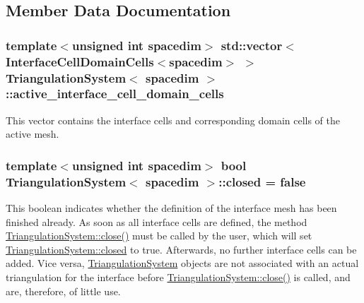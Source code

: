 \subsection{Member Data Documentation}
\subsubsection[{\texorpdfstring{active\+\_\+interface\+\_\+cell\+\_\+domain\+\_\+cells}{active_interface_cell_domain_cells}}]{\setlength{\rightskip}{0pt plus 5cm}template$<$unsigned int spacedim$>$ std\+::vector$<${\bf Interface\+Cell\+Domain\+Cells}$<$spacedim$>$ $>$ {\bf Triangulation\+System}$<$ spacedim $>$\+::active\+\_\+interface\+\_\+cell\+\_\+domain\+\_\+cells\hspace{0.3cm}{\ttfamily [private]}}\hypertarget{class_triangulation_system_a516c7a253cefbc5e208714538b21424d}{}\label{class_triangulation_system_a516c7a253cefbc5e208714538b21424d}
This vector contains the interface cells and corresponding domain cells of the active mesh. 
\subsubsection[{\texorpdfstring{closed}{closed}}]{\setlength{\rightskip}{0pt plus 5cm}template$<$unsigned int spacedim$>$ bool {\bf Triangulation\+System}$<$ spacedim $>$\+::closed = false\hspace{0.3cm}{\ttfamily [protected]}}\hypertarget{class_triangulation_system_aef5ae937cc00b7954357bb8ae88b1f73}{}\label{class_triangulation_system_aef5ae937cc00b7954357bb8ae88b1f73}
This boolean indicates whether the definition of the interface mesh has been finished already. As soon as all interface cells are defined, the method \hyperlink{class_triangulation_system_ad3605f3f59fbd55942288026107c4e6d}{Triangulation\+System\+::close()} must be called by the user, which will set \hyperlink{class_triangulation_system_aef5ae937cc00b7954357bb8ae88b1f73}{Triangulation\+System\+::closed} to {\ttfamily true}. Afterwards, no further interface cells can be added. Vice versa, \hyperlink{class_triangulation_system}{Triangulation\+System} objects are not associated with an actual triangulation for the interface before \hyperlink{class_triangulation_system_ad3605f3f59fbd55942288026107c4e6d}{Triangulation\+System\+::close()} is called, and are, therefore, of little use. 
